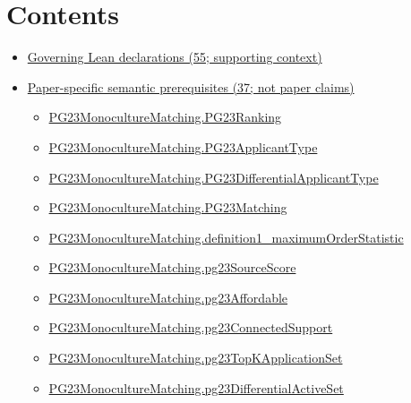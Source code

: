 \documentclass[10pt]{article}
\begin{document}
\section*{Contents}
\begin{itemize}[leftmargin=1.2em]
\item \hyperlink{governing-declaration-section-5ef5ef0364b6939c}{Governing Lean declarations (55; supporting context)}
\item \hyperlink{paper-prerequisite-section-5ef5ef0364b6939c}{Paper-specific semantic prerequisites (37; not paper claims)}
\begin{itemize}[leftmargin=1.2em]
\item \hyperlink{paper-prerequisite-8769258a80216d15}{PG23\allowbreak{}Monoculture\allowbreak{}Matching.\allowbreak{}PG23\allowbreak{}Ranking}
\item \hyperlink{paper-prerequisite-40ad59c353cf95ec}{PG23\allowbreak{}Monoculture\allowbreak{}Matching.\allowbreak{}PG23\allowbreak{}Applicant\allowbreak{}Type}
\item \hyperlink{paper-prerequisite-0e52fd2509d39629}{PG23\allowbreak{}Monoculture\allowbreak{}Matching.\allowbreak{}PG23\allowbreak{}Differential\allowbreak{}Applicant\allowbreak{}Type}
\item \hyperlink{paper-prerequisite-6458c12e2da75e1b}{PG23\allowbreak{}Monoculture\allowbreak{}Matching.\allowbreak{}PG23\allowbreak{}Matching}
\item \hyperlink{paper-prerequisite-57639cb7f2323508}{PG23\allowbreak{}Monoculture\allowbreak{}Matching.\allowbreak{}definition1\_\allowbreak{}maximum\allowbreak{}Order\allowbreak{}Statistic}
\item \hyperlink{paper-prerequisite-9b09ee190ab81202}{PG23\allowbreak{}Monoculture\allowbreak{}Matching.\allowbreak{}pg23\allowbreak{}Source\allowbreak{}Score}
\item \hyperlink{paper-prerequisite-2e1064bd8fa39b1d}{PG23\allowbreak{}Monoculture\allowbreak{}Matching.\allowbreak{}pg23\allowbreak{}Affordable}
\item \hyperlink{paper-prerequisite-3ea91dd17eec5e64}{PG23\allowbreak{}Monoculture\allowbreak{}Matching.\allowbreak{}pg23\allowbreak{}Connected\allowbreak{}Support}
\item \hyperlink{paper-prerequisite-fbb477a6e065abfa}{PG23\allowbreak{}Monoculture\allowbreak{}Matching.\allowbreak{}pg23\allowbreak{}Top\allowbreak{}K\allowbreak{}Application\allowbreak{}Set}
\item \hyperlink{paper-prerequisite-76cf82d9a96bf02f}{PG23\allowbreak{}Monoculture\allowbreak{}Matching.\allowbreak{}pg23\allowbreak{}Differential\allowbreak{}Active\allowbreak{}Set}

\end{itemize}
\end{itemize}
\end{document}
